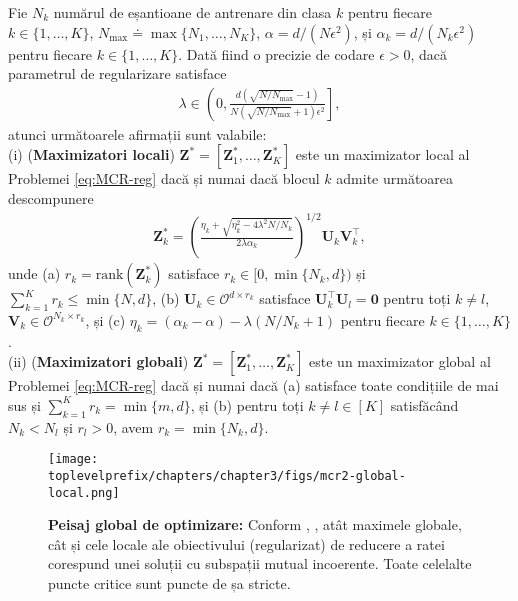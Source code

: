 \documentclass[../../book-main_ro.tex]{subfiles}
\begin{document}
\begin{theorem}\label{thm:mcr-global-opt}
	Fie $N_k$ numărul de eșantioane de antrenare din clasa $k$ pentru fiecare $k \in \{1,\dots,K\}$, $N_{\max} \doteq \max\{N_1,\dots,N_K\}$, $\alpha=d/(N\epsilon^2)$, și $\alpha_{k} = d/(N_k\epsilon^2)$ pentru fiecare $k \in \{1,\dots,K\}$. Dată fiind o precizie de codare $\epsilon > 0$, dacă parametrul de regularizare satisface
	\begin{align}\label{eq:lambda}
		\lambda \in \left(0, \frac{d(\sqrt{N/N_{\max}}-1)}{N(\sqrt{N/N_{\max}}+1)\epsilon^2} \right],
	\end{align}
	atunci următoarele afirmații sunt valabile: \\
	(i) ({\bf Maximizatori locali}) $\bm Z^* = \left[\bm Z_1^*,\dots,\bm Z_K^* \right]$ este un maximizator local al Problemei \eqref{eq:MCR-reg} dacă și numai dacă blocul $k$ admite următoarea descompunere
	\begin{align}\label{eq:Zk opti}
		\bm Z_k^* = \left(\frac{ \eta_k + \sqrt{\eta_k^2 - 4\lambda^2N/N_k}}{2\lambda \alpha_{k}}\right)^{1/2} \bm U_k \bm V_k^\top,
	\end{align}
	unde (a) $r_k = \mathrm{rank}(\bm Z_k^*)$ satisface $r_k \in [0,\min\{N_k,d\})$ și $\sum_{k=1}^K r_k \le \min\{N,d\}$, (b) $\bm U_k \in \mathcal{O}^{d \times r_k}$ satisface $\bm U_k^{\top}\bm U_l = \bm 0$ pentru toți $k \neq l$, $\bm V_k \in \mathcal{O}^{N_k \times r_k}$, și (c) $\eta_k=(\alpha_k-\alpha) - \lambda(N/N_k+1)$ pentru fiecare $k\in \{1,\dots,K\}$.
	\\
	(ii) ({\bf Maximizatori globali}) $\bm Z^* = \left[\bm Z_1^*,\dots,\bm Z_K^* \right]$ este un maximizator global al Problemei \eqref{eq:MCR-reg} dacă și numai dacă (a) satisface toate condițiile de mai sus și $\sum_{k=1}^K r_k = \min\{m,d\}$, și (b) pentru toți $k \neq l \in [K]$ satisfăcând $N_k < N_l$ și $r_l > 0$, avem $r_k = \min\{N_k,d\}$.
\end{theorem}

\begin{figure}[t]
	\centering
	\texttt{[image: \\toplevelprefix/chapters/chapter3/figs/mcr2-global-local.png]}
	\caption{{\bf Peisaj global de optimizare:} Conform \cite{sun2015nonconvex,lee2016gradient}, , atât maximele globale, cât și cele locale ale obiectivului (regularizat) de reducere a ratei corespund unei soluții cu subspații mutual incoerente. Toate celelalte puncte critice sunt puncte de șa stricte.}
	\label{fig:mcr-global-local}
\end{figure}
\end{document}
